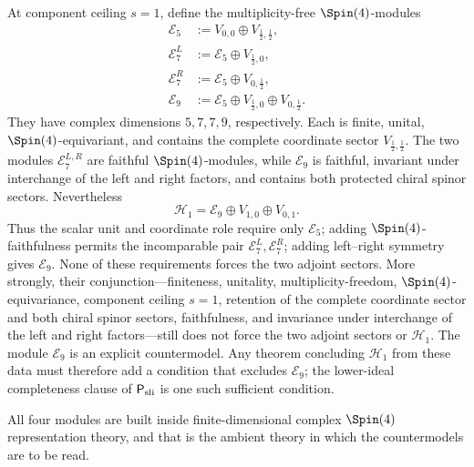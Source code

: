 \documentclass[11pt,a4paper]{article}
\begin{document}
\begin{proposition}
\label{p2:prop:spectral-lower-ideal-sharpness}
At component ceiling \(s=1\), define the multiplicity-free
\(\Spin(4)\)-modules
\[
\begin{aligned}
 \mathcal E_5
 &:=
 V_{0,0}\oplus V_{\frac12,\frac12},\\
 \mathcal E_7^L
 &:=
 \mathcal E_5\oplus V_{\frac12,0},\\
 \mathcal E_7^R
 &:=
 \mathcal E_5\oplus V_{0,\frac12},\\
 \mathcal E_9
 &:=
 \mathcal E_5\oplus
 V_{\frac12,0}\oplus V_{0,\frac12}.
\end{aligned}
\]
They have complex dimensions \(5,7,7,9\), respectively.  Each is finite,
unital, \(\Spin(4)\)-equivariant, and contains the complete coordinate sector
\(V_{\frac12,\frac12}\).  The two modules
\(\mathcal E_7^{L,R}\) are faithful \(\Spin(4)\)-modules, while
\(\mathcal E_9\) is faithful, invariant under interchange of the left and
right factors, and contains both protected chiral spinor sectors.  Nevertheless
\[
 \mathcal H_1
 =
 \mathcal E_9\oplus V_{1,0}\oplus V_{0,1}.
\]
Thus the scalar unit and coordinate role require only \(\mathcal E_5\);
adding \(\Spin(4)\)-faithfulness permits the incomparable pair
\(\mathcal E_7^L,\mathcal E_7^R\); adding left--right symmetry gives
\(\mathcal E_9\).  None of these requirements forces the two adjoint sectors.
More strongly, their conjunction---finiteness, unitality,
multiplicity-freedom, \(\Spin(4)\)-equivariance, component ceiling \(s=1\),
retention of the complete coordinate sector and both chiral spinor sectors,
faithfulness, and invariance under interchange of the left and right
factors---still does not force the two adjoint sectors or
\(\mathcal H_1\).  The module \(\mathcal E_9\) is an explicit countermodel.
Any theorem concluding \(\mathcal H_1\) from these data must therefore add a
condition that excludes \(\mathcal E_9\); the lower-ideal completeness clause
of \(\mathsf P_{\rm sli}\) is one such sufficient condition.

All four modules are built inside finite-dimensional complex \(\Spin(4)\)
representation theory, and that is the ambient theory in which the
countermodels are to be read.


\end{proposition}
\end{document}
